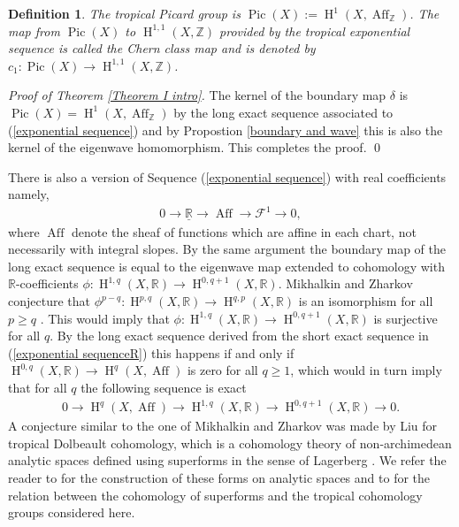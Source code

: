 \documentclass[11pt]{article}
\numberwithin{equation}{numsection}
\newcommand{\Z}{{\mathbb Z}}
\newcommand{\RR}{{\mathbb R}}
\newcommand{\R}{{\mathbb R}}
\newcommand{\F}{{\mathcal F}}
\DeclareMathOperator{\Pic}{Pic}
\DeclareMathOperator{\Aff}{Aff}
\DeclareMathOperator{\HH}{H}
\newtheorem{defn}[thm]{Definition}
\begin{document}
\begin{defn} \label{def:Pic}
The \emph{tropical Picard group} is  $\Pic(X):= \HH^{1}(X, \Aff_{\Z})$. 
The map from $\Pic(X)$ to  $\HH^{1,1}(X, \Z)$ provided by the tropical exponential sequence is
called the \emph{Chern class map} and is denoted by $c_1 \colon \Pic(X) \to \HH^{1,1}(X, \Z)$.
\end{defn}


\begin{proof}[Proof of Theorem \ref{Theorem I intro}]
The kernel of the boundary map $\delta$ is $\Pic(X) = \HH^1(X, \Aff_{\Z})$ by the long exact sequence associated to (\ref{exponential sequence}) 
and by Propostion \ref{boundary and wave} this is also the kernel of the eigenwave  homomorphism. 
This completes the proof. 
\qed
\end{proof}


\begin{rem}{\rm
There is also a version of Sequence (\ref{exponential sequence}) with real coefficients namely,  
\begin{align} \label{exponential sequenceR}
  0 \to \underline{\RR} \to \Aff \to \F^1 \to 0,
\end{align}
where $\Aff$ denote the sheaf of functions which are affine in each chart, not necessarily with integral slopes.
By the same argument the boundary map of the long exact sequence is equal to the eigenwave map extended to cohomology with $\R$-coefficients 
$\phi \colon \HH^{1, q}(X, \R) \to \HH^{0,q+1}(X, \R)$. 
Mikhalkin and Zharkov  conjecture that 
$\phi^{p-q} \colon \HH^{p,q}(X, \R) \to \HH^{q,p}(X, \R)$ is an isomorphism for all $p \geq q$  \cite[Conjecture 5.3]{MikZhar}. 
This would imply that $\phi \colon \HH^{1,q}(X, \R) \to \HH^{0,q+1}(X, \R)$ is surjective for all $q$.
By the long exact sequence derived from the short exact sequence in (\ref{exponential sequenceR}) 
this happens if and only if $\HH^{0,q}(X, \R) \to \HH^{q}(X, \Aff)$ is zero for all $q \geq 1$, 
which would in turn imply that for all $q$ the following sequence is exact
\begin{align*}
0 \to \HH^{q}(X, \Aff) \to \HH^{1,q}(X, \R) \to \HH^{0,q+1}(X, \R) \to 0.
\end{align*}
A conjecture similar to the one of Mikhalkin and Zharkov was made by Liu \cite{Yifeng} for tropical Dolbeault cohomology,
which is a cohomology theory of non-archimedean analytic spaces defined using superforms in the sense of Lagerberg \cite{Lagerberg}. 
We refer the reader to \cite{CLD, Gubler} for the construction of these forms on analytic spaces and 
to \cite{JSS} for the relation between the cohomology of superforms and the tropical cohomology groups considered here.}
\end{rem} 
\end{document}

